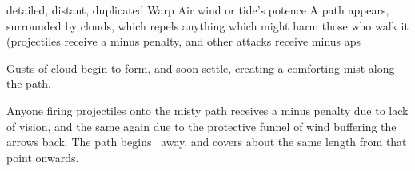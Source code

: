   {detailed, distant, duplicated}%
  {Warp}%
  {Air}%
  {wind or tide's potence}%
  {A path appears, surrounded by clouds, which repels anything which might harm those who walk it (projectiles receive a minus  penalty, and other attacks receive minus  \glspl{ap}}%
  {Gusts of cloud begin to form, and soon settle, creating a comforting mist along the path.

    Anyone firing projectiles onto the misty path receives a minus  penalty due to lack of vision, and the same again due to the protective funnel of wind buffering the arrows back.
    The path begins \spellRange\ away, and covers about the same length from that point onwards.
}
